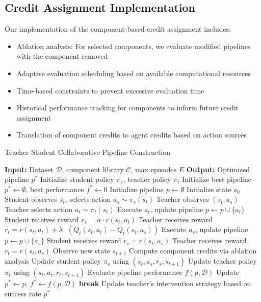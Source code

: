 \documentclass[twoside,11pt]{article}
\begin{document}
\subsection{Credit Assignment Implementation}

Our implementation of the component-based credit assignment includes:

\begin{itemize}
    \item Ablation analysis: For selected components, we evaluate modified pipelines with the component removed
    \item Adaptive evaluation scheduling based on available computational resources
    \item Time-based constraints to prevent excessive evaluation time
    \item Historical performance tracking for components to inform future credit assignment
    \item Translation of component credits to agent credits based on action sources
\end{itemize}

\begin{algorithm}[ht]
\caption{Teacher-Student Collaborative Pipeline Construction}
\begin{algorithmic}[1]
  \STATE \textbf{Input:} Dataset $\mathcal{D}$, component library $\mathcal{C}$, max episodes $E$
  \STATE \textbf{Output:} Optimized pipeline $p^*$
  \STATE Initialize student policy $\pi_s$, teacher policy $\pi_t$
  \STATE Initialize best pipeline $p^* \gets \emptyset$, best performance $f^* \gets 0$
    \STATE Initialize pipeline $p \gets \emptyset$
    \STATE Initialize state $s_0$
      \STATE Student observes $s_t$, selects action $a_s \sim \pi_s(s_t)$
      \STATE Teacher observes $(s_t, a_s)$
        \STATE Teacher selects action $a_t \sim \pi_t(s_t)$
        \STATE Execute $a_t$, update pipeline $p \gets p \cup \{a_t\}$
        \STATE Student receives reward $r_s = \alpha \cdot r(s_t, a_t)$
        \STATE Teacher receives reward $r_t = r(s_t, a_t) + \lambda \cdot (Q_t(s_t, a_t) - Q_t(s_t, a_s))$
      \ELSE
        \STATE Execute $a_s$, update pipeline $p \gets p \cup \{a_s\}$
        \STATE Student receives reward $r_s = r(s_t, a_s)$
        \STATE Teacher receives reward $r_t = r(s_t, a_s)$
      \ENDIF
      \STATE Observe new state $s_{t+1}$
      \STATE Compute component credits via ablation analysis
      \STATE Update student policy $\pi_s$ using $(s_t, a_s, r_s, s_{t+1})$
      \STATE Update teacher policy $\pi_t$ using $(s_t, a_t, r_t, s_{t+1})$
        \STATE Evaluate pipeline performance $f(p, \mathcal{D})$
          \STATE Update $p^* \gets p$, $f^* \gets f(p, \mathcal{D})$
        \ENDIF
        \STATE \textbf{break}
      \ENDIF
    \ENDFOR
    \STATE Update teacher's intervention strategy based on success rate
  \ENDFOR
  \RETURN $p^*$
\end{algorithmic}
\end{algorithm}
\end{document}
